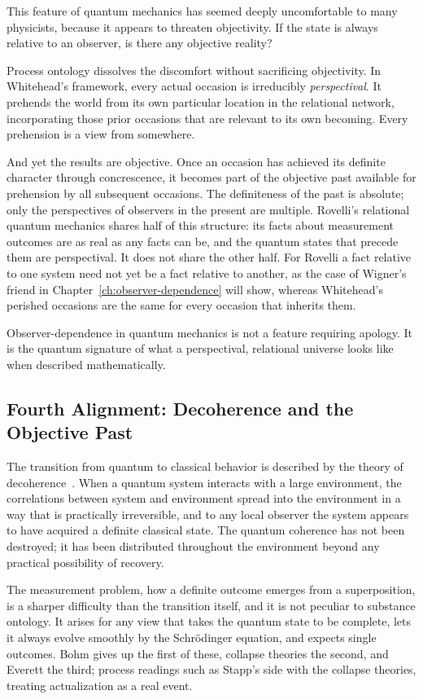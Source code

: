 This feature of quantum mechanics has seemed deeply uncomfortable to many
physicists, because it appears to threaten objectivity.
If the state is always relative to an observer, is there any objective reality?

Process ontology dissolves the discomfort without sacrificing objectivity.
In Whitehead's framework, every actual occasion is irreducibly \emph{perspectival}.
It prehends the world from its own particular location in the relational network,
incorporating those prior occasions that are relevant to its own becoming.
Every prehension is a view from somewhere.

And yet the results are objective.
Once an occasion has achieved its definite character through concrescence, it
becomes part of the objective past available for prehension by all subsequent
occasions.
The definiteness of the past is absolute; only the perspectives of observers in
the present are multiple.
Rovelli's relational quantum mechanics shares half of this structure: its facts
about measurement outcomes are as real as any facts can be, and the quantum
states that precede them are perspectival.
It does not share the other half.
For Rovelli a fact relative to one system need not yet be a fact relative to
another, as the case of Wigner's friend in Chapter~\ref{ch:observer-dependence}
will show, whereas Whitehead's perished occasions are the same for every occasion
that inherits them.

Observer-dependence in quantum mechanics is not a feature requiring apology.
It is the quantum signature of what a perspectival, relational universe looks like
when described mathematically.

\subsection*{Fourth Alignment: Decoherence and the Objective Past}

The transition from quantum to classical behavior is described by the theory of
decoherence~\citep{Zurek2003}.
When a quantum system interacts with a large environment, the correlations
between system and environment spread into the environment in a way that is
practically irreversible, and to any local observer the system appears to have
acquired a definite classical state.
The quantum coherence has not been destroyed; it has been distributed throughout
the environment beyond any practical possibility of recovery.

The measurement problem, how a definite outcome emerges from a superposition, is
a sharper difficulty than the transition itself, and it is not peculiar to
substance ontology.
It arises for any view that takes the quantum state to be complete, lets it
always evolve smoothly by the Schr\"odinger equation, and expects single
outcomes.
Bohm gives up the first of these, collapse theories the second, and Everett the
third; process readings such as Stapp's side with the collapse theories, treating
actualization as a real event.

